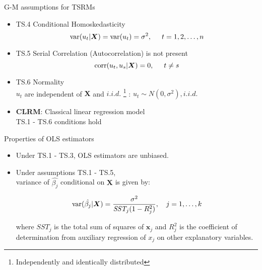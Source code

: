 \documentclass{beamer}
\begin{document}

\begin{frame}{G-M assumptions for TSRMs}
\begin{itemize}
 \item TS.4 Conditional Homoskedasticity 
 $$\textnormal{var}(u_t|\boldsymbol{X})=\textnormal{var}(u_t)=\sigma^2, \hspace{0.5cm} t=1,2,\dots,n$$
 
 \item TS.5 Serial Correlation (Autocorrelation) is not present $$ \textnormal{corr}(u_t,u_s|\boldsymbol{X}) = 0, \hspace{0.5cm} t\neq s$$

 \item TS.6 Normality \\
 $u_t$ are independent of $\boldsymbol{X}$ and $\textit{i.i.d.}$
 \footnote{Independently and identically distributed} 
 :  $u_t \sim N(0,\sigma^2), \textit{i.i.d.} $
 
 \vspace{0.6cm}
 
 \item \textbf{CLRM}: Classical linear regression model \\
 TS.1 - TS.6 conditions hold
 
\end{itemize}
\end{frame}


\begin{frame}{Properties of OLS estimators}
\begin{itemize}
\item Under TS.1 - TS.3, OLS estimators are unbiased.
\vspace{0.5cm}
\item Under assumptions TS.1 - TS.5, \\ 
variance of $\hat{\beta_j}$ conditional on $\boldsymbol{X}$ is given by: 

$$\textnormal{var}(\hat{\beta_j}|\boldsymbol{X}) 
  =\frac{\sigma^2}{\textit{SST}_j(1-R^2_j)}, \quad j=1,\dots,k$$

where $\textit{SST}_j$ is the total sum of squares of $\boldsymbol{x}_{j}$ and $R^2_j$ is the coefficient of determination from auxiliary regression of $x_j$ on other explanatory variables. 
\end{itemize}
\end{frame}
\end{document}

